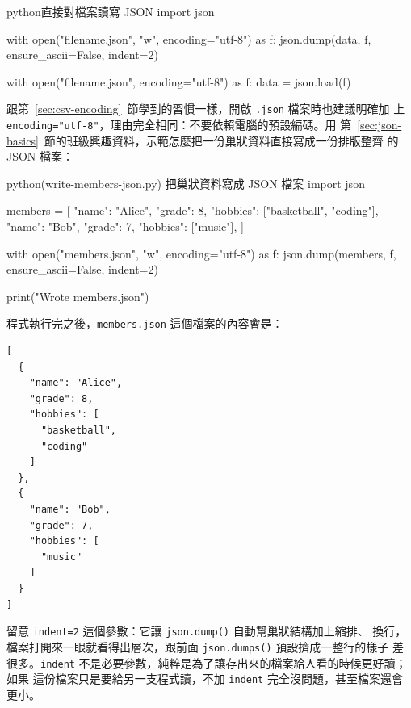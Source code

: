 
\begin{code}{python}{直接對檔案讀寫 JSON}
import json

with open("filename.json", "w", encoding="utf-8") as f:
    json.dump(data, f, ensure_ascii=False, indent=2)

with open("filename.json", encoding="utf-8") as f:
    data = json.load(f)
\end{code}

跟第~\ref{sec:csv-encoding}~節學到的習慣一樣，開啟 \texttt{.json} 檔案時也建議明確加
上 \texttt{encoding="utf-8"}，理由完全相同：不要依賴電腦的預設編碼。用
第~\ref{sec:json-basics}~節的班級興趣資料，示範怎麼把一份巢狀資料直接寫成一份排版整齊
的 JSON 檔案：

\begin{example}{python}{(write-members-json.py) 把巢狀資料寫成 JSON 檔案}
import json

members = [
    {"name": "Alice", "grade": 8, "hobbies": ["basketball", "coding"]},
    {"name": "Bob", "grade": 7, "hobbies": ["music"]},
]

with open("members.json", "w", encoding="utf-8") as f:
    json.dump(members, f, ensure_ascii=False, indent=2)

print("Wrote members.json")
\end{example}


程式執行完之後，\texttt{members.json} 這個檔案的內容會是：

\begin{verbatim}
[
  {
    "name": "Alice",
    "grade": 8,
    "hobbies": [
      "basketball",
      "coding"
    ]
  },
  {
    "name": "Bob",
    "grade": 7,
    "hobbies": [
      "music"
    ]
  }
]
\end{verbatim}

留意 \texttt{indent=2} 這個參數：它讓 \texttt{json.dump()} 自動幫巢狀結構加上縮排、
換行，檔案打開來一眼就看得出層次，跟前面 \texttt{json.dumps()} 預設擠成一整行的樣子
差很多。\texttt{indent} 不是必要參數，純粹是為了讓存出來的檔案給人看的時候更好讀；如果
這份檔案只是要給另一支程式讀，不加 \texttt{indent} 完全沒問題，甚至檔案還會更小。

